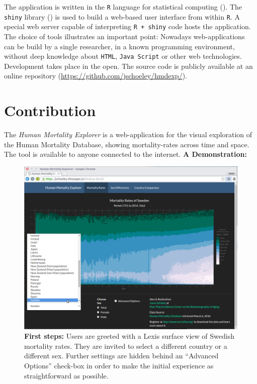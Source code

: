\documentclass[
  12pt
]{scrartcl}
\begin{document}
The application is written in the \texttt{R} language for statistical computing (\cite{RCT2016}). The \texttt{shiny} library (\cite{Chang2016}) is used to build a web-based user interface from within \texttt{R}. A special web server capable of interpreting \texttt{R + shiny} code hosts the application. The choice of tools illustrates an important point: Nowadays web-applications can be build by a single researcher, in a known programming environment, without deep knowledge about \texttt{HTML}, \texttt{Java Script} or other web technologies. Development takes place in the open. The source code is publicly available at an online repository (\url{https://github.com/jschoeley/hmdexp/}).

\section*{Contribution}

The \emph{Human Mortality Explorer} is a web-application for the visual exploration of the Human Mortality Database, showing mortality-rates across time and space. The tool is available to anyone connected to the internet. \textbf{A Demonstration:}

\begin{figure}[ht!]\centering
  \includegraphics[width = \linewidth]{./fig/hmd_screen_mx.png}
  \caption*{\textbf{First steps:} Users are greeted with a Lexis surface view of Swedish mortality rates. They are invited to select a different country or a different sex. Further settings are hidden behind an \enquote{Advanced Options} check-box in order to make the initial experience as straightforward as possible.}
  \label{fig:mx}
\end{figure}
\end{document}
